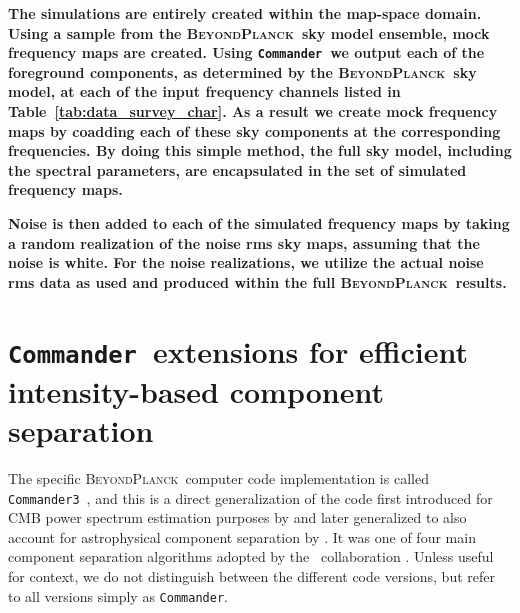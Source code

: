 \documentclass[twocolumn]{aa}
\def\commander{\texttt{Commander}}
\def\commanderthree{\texttt{Commander3}}
\newcommand{\BP}{\textsc{BeyondPlanck}}
\begin{document}
\textbf{The simulations are entirely created within the map-space domain. Using a sample from the \BP\ sky model ensemble, mock frequency maps are created. Using  \commander\ we output each of the foreground components, as determined by the \BP\ sky model, at each of the input frequency channels listed in Table~\ref{tab:data_survey_char}. As a result we create mock frequency maps by coadding each of these sky components at the corresponding frequencies. By doing this simple method, the full sky model, including the spectral parameters, are encapsulated in the set of simulated frequency maps.}

\textbf{Noise is then added to each of the simulated frequency maps by taking a random realization of the noise rms sky maps, assuming that the noise is white. For the noise realizations, we utilize the actual noise rms data as used and produced within the full \BP\ results.}




\section{\commander\ extensions for efficient intensity-based component separation}
\label{sec:algorithms}

The specific \BP\ computer code implementation is called
\commanderthree\ \citep{bp03}, and this is a direct generalization of the
code first introduced for CMB power spectrum estimation purposes by
\citet{eriksen:2004} and later generalized to also account for
astrophysical component separation by
\citet{eriksen2008,seljebotn:2013,seljebotn:2019}. It was one of four
main component separation algorithms adopted by the
\Planck\ collaboration \citep{planck2013-p06, planck2014-a12,
  planck2016-l04, npipe}. Unless useful for context, we do not
distinguish between the different code versions, but refer to all versions
simply as \commander.
\end{document}
